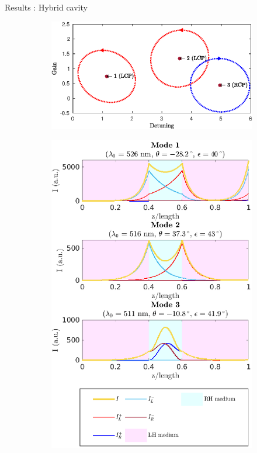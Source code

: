 \documentclass[aspectratio=169]{beamer}
\begin{document}
\begin{frame}{Results : Hybrid cavity}
	\begin{figure}
		\centering
		\begin{subfigure}{0.49\textwidth}
			\includegraphics[width=\linewidth]{plots/hybrid/modes_found}
		\end{subfigure}
		\begin{subfigure}{0.49\textwidth}
			\centering
			\includegraphics[height=0.8\textheight]{plots/hybrid/intensity_distribution}
		\end{subfigure}	
	\end{figure}
\end{frame}
\end{document}
